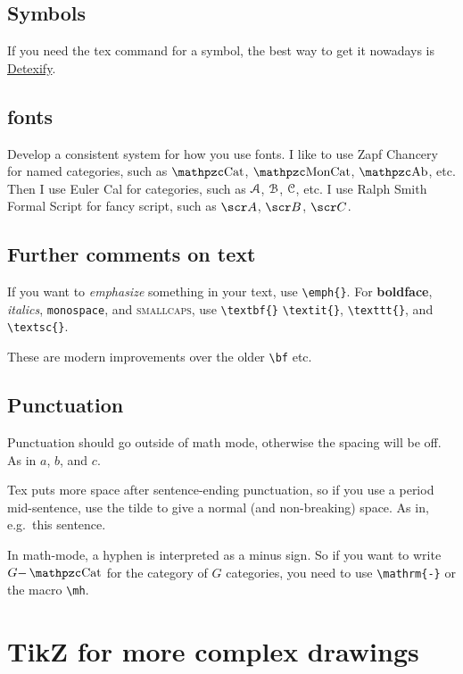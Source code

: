 \documentclass[11pt,oneside,draft]{amsart}
\begin{document}
\subsection{Symbols}

If you need the tex command for a symbol, the best way to get it
nowadays is
\href{http://detexify.kirelabs.org/classify.html}{Detexify}.

\subsection{fonts}

Develop a consistent system for how you use fonts.  I like to use Zapf
Chancery for named categories, such as $\Cat$, $\MonCat$, $\Ab$, etc.
Then I use Euler Cal for categories, such as $\mathcal{A}$, $\mathcal{B}$, $\mathcal{C}$,
etc.  I use Ralph Smith Formal Script for fancy script, such as $\sA$,
$\sB$, $\sC$.


\subsection{Further comments on text}

If you want to \emph{emphasize} something in your text, use
\verb|\emph{}|.  For \textbf{boldface}, \textit{italics},
\texttt{monospace}, and \textsc{smallcaps}, use \verb|\textbf{}|
\verb|\textit{}|, \verb|\texttt{}|, and \verb|\textsc{}|.

These are modern improvements over the older \verb|\bf| etc.

\subsection{Punctuation}

Punctuation should go outside of math mode, otherwise the spacing will
be off.  As in $a$, $b$, and $c$.

Tex puts more space after sentence-ending punctuation, so if you use a
period mid-sentence, use the tilde to give a normal (and non-breaking)
space.  As in, e.g.~this sentence.

In math-mode, a hyphen is interpreted as a minus sign.  So if you want
to write $G\mh\Cat$ for the category of $G$ categories, you need to
use \verb|\mathrm{-}| or the macro \verb|\mh|.


\section{TikZ for more complex drawings}
\end{document}
